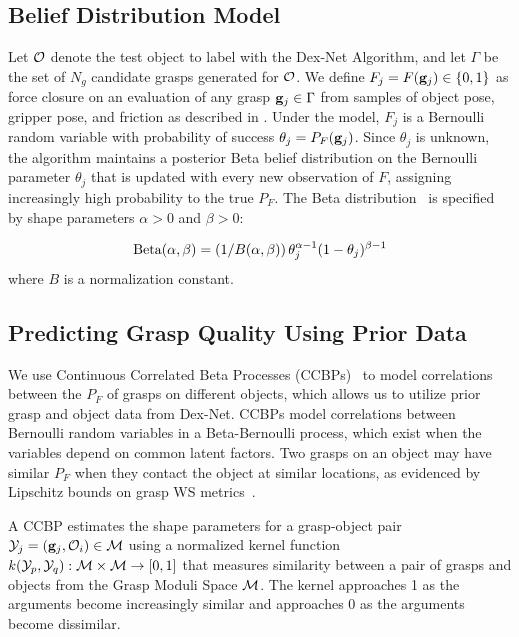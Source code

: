 \subsection{Belief Distribution Model}
Let $\mathcal{O}$ denote the test object to label with the Dex-Net Algorithm, and let $\Gamma$ be the set of $N_g$ candidate grasps generated for $\mathcal{O}$.
We define $F_{j} = F(\mathbf{g}_{j}) \in \{0, 1\}$ as force closure on an evaluation of any grasp $\mathbf{g}_{j} \in \Gamma$ from samples of object pose, gripper pose, and friction as described in .
Under the model, $F_j$ is a Bernoulli random variable with probability of success $\theta_{j}= P_F(\mathbf{g}_{j})$.
Since $\theta_j$ is unknown, the algorithm maintains a posterior Beta belief distribution on the Bernoulli parameter $\theta_{j}$ that is updated with every new observation of $F$, assigning increasingly high probability to the true $P_F$. 
The Beta distribution~\cite{hoffman2013exploiting, laskey2015bandits} is specified by shape parameters $\alpha > 0$ and $\beta > 0$:

\vspace{-4ex}
\begin{align*}
	\text{Beta}(\alpha, \beta) = \left( 1 / B(\alpha, \beta) \right) \theta_j^{\alpha-1} (1 - \theta_j)^{\beta-1}
\end{align*}
\noindent where $B$ is a normalization constant.

\subsection{Predicting Grasp Quality Using Prior Data}
We use Continuous Correlated Beta Processes (CCBPs)~\cite{goetschalckx2011continuous, montesano2012active} to model correlations between the $P_F$ of grasps on different objects, which allows us to utilize prior grasp and object data from Dex-Net.
CCBPs model correlations between Bernoulli random variables in a Beta-Bernoulli process, which exist when the variables depend on common latent factors.
Two grasps on an object may have similar $P_F$ when they contact the object at similar locations, as evidenced by Lipschitz bounds on grasp WS metrics~\cite{pokorny2013c}.

A CCBP estimates the shape parameters for a grasp-object pair $\mathcal{Y}_{j} = (\mathbf{g}_{j}, \mathcal{O}_{i}) \in \mathcal{M}$ using a normalized kernel function $k(\mathcal{Y}_p, \mathcal{Y}_q) : \mathcal{M} \times \mathcal{M} \rightarrow [0,1]$ that measures similarity between a pair of grasps and objects from the Grasp Moduli Space $\mathcal{M}$.
The kernel approaches 1 as the arguments become increasingly similar and approaches 0 as the arguments become dissimilar.

